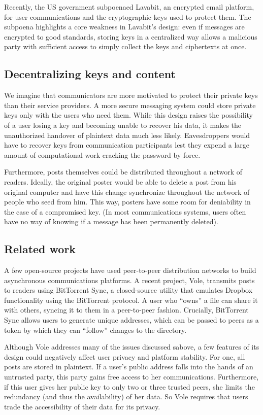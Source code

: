 \documentclass{article}
\begin{document}
Recently, the US government subpoenaed Lavabit, an encrypted email platform, for user communications and the cryptographic keys used to protect them. \cite{lavabit} The subpoena highlights a core weakness in Lavabit's design: even if messages are encrypted to good standards, storing keys in a centralized way allows a malicious party with sufficient access to simply collect the keys and ciphertexts at once. 

\subsection{Decentralizing keys and content}
We imagine that communicators are more motivated to protect their private keys than their service providers. A more secure messaging system could store private keys only with the users who need them. While this design raises the possibility of a user losing a key and becoming unable to recover his data, it makes the unauthorized handover of plaintext data much less likely. Eavesdroppers would have to recover keys from communication participants lest they expend a large amount of computational work cracking the password by force. 

Furthermore, posts themselves could be distributed throughout a network of readers. Ideally, the original poster would be able to delete a post from his original computer and have this change synchronize throughout the network of people who seed from him. This way, posters have some room for deniability in the case of a compromised key. (In most communications systems, users often have no way of knowing if a message has been permanently deleted).

\subsection{Related work}
A few open-source projects have used peer-to-peer distribution networks to build asynchronous communications platforms. \cite{blogracy,frenzy} A recent project, Vole, transmits posts to readers using BitTorrent Sync, a closed-source utility that emulates Dropbox functionality using the BitTorrent protocol. \cite{vole,bts,cohen03} A user who ``owns'' a file can share it with others, syncing it to them in a peer-to-peer fashion. Crucially, BitTorrent Sync allows users to generate unique addresses, which can be passed to peers as a token by which they can “follow” changes to the directory. 

Although Vole addresses many of the issues discussed sabove, a few features of its design could negatively affect user privacy and platform stability. For one, all posts are stored in plaintext. If a user's public address falls into the hands of an untrusted party, this party gains free access to her communications. Furthermore, if this user gives her public key to only two or three trusted peers, she limits the redundancy (and thus the availability) of her data. So Vole requires that users trade the accessibility of their data for its privacy.
\end{document}
